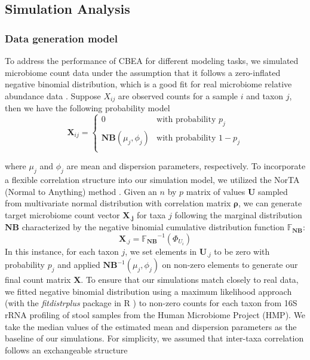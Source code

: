 \subsection*{Simulation Analysis}
\subsubsection*{Data generation model}  
To address the performance of CBEA for different modeling tasks, we simulated microbiome count data under the assumption that it follows a zero-inflated negative binomial distribution, which is a good fit for real microbiome relative abundance data \cite{calgaro2020}. Suppose $X_{ij}$ are observed counts for a sample $i$ and taxon $j$, then we have the following probability model
\begin{equation}
    \mathbf{X}_{ij} =
      \begin{cases}
        0 & \text{with probability $p_j$}\\
        \mathbf{NB}(\mu_j, \phi_j) & \text{with probability $1 - p_j$}\\
      \end{cases}       
\end{equation}

where $\mu_j$ and $\phi_j$ are mean and dispersion parameters, respectively. To incorporate a flexible correlation structure into our simulation model, we utilized the NorTA (Normal to Anything) method \cite{cario1997}. Given an $n$ by $p$ matrix of values $\mathbf{U}$ sampled from multivariate normal distribution with correlation matrix $\mathbf{\rho}$, we can generate target microbiome count vector $\mathbf{X_{.j}}$ for taxa $j$ following the marginal distribution $\mathbf{NB}$ characterized by the negative binomial cumulative distribution function $\mathbb{F_{\mathbf{NB}}}$:
\begin{equation}
    \mathbf{X}_{.j} = \mathbb{F_{\mathbf{NB}}}^{-1}(\Phi_{U_i})
\end{equation}
In this instance, for each taxon $j$, we set elements in $\mathbf{U}_{.j}$ to be zero with probability $p_j$ and applied $\mathbf{NB}^{-1}(\mu_j, \phi_j)$ on non-zero elements to generate our final count matrix $\mathbf{X}$. To ensure that our simulations match closely to real data, we fitted negative binomial distribution using a maximum likelihood approach (with the \emph{fitdistrplus} package in R \cite{delignette-muller2015}) to non-zero counts for each taxon from 16S rRNA profiling of stool samples from the Human Microbiome Project (HMP). We take the median values of the estimated mean and dispersion parameters as the baseline of our simulations. For simplicity, we assumed that inter-taxa correlation follows an exchangeable structure


